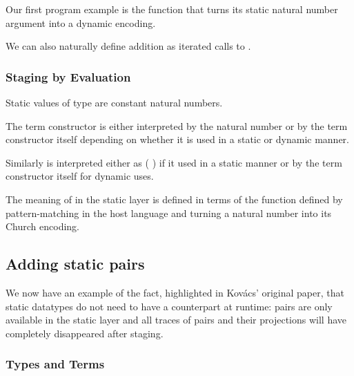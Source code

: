 \documentclass{article}
\begin{document}

Our first program example is the function  that
turns its static natural number argument into a dynamic
encoding.


We can also naturally define addition as iterated calls to
.

\label{def:add}

\subsubsection{Staging by Evaluation}

Static values of type  are constant natural numbers.


The term constructor  is either interpreted by
the natural number  or by the term constructor itself
depending on whether it is used in a static or dynamic manner.


Similarly  is interpreted either as ( \AF{+}\AS{\_})
if it used in a static manner or by the term constructor itself
for dynamic uses.


The meaning of  in the static layer is defined in
terms of the  function defined by pattern-matching
in the host language and turning a natural number into its
Church encoding.


\subsection{Adding static pairs}\label{sec:stagingmodelprod}

We now have an example of the fact, highlighted in Kov{\'{a}}cs'
original paper, that static datatypes do not need to have a
counterpart at runtime: pairs are only available in the static
layer and all traces of pairs and their projections will have
completely disappeared after staging.

\subsubsection{Types and Terms}
\end{document}
